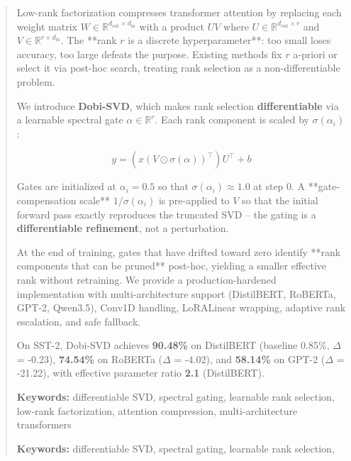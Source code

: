 \documentclass[10pt,twocolumn,letterpaper]{article}
\begin{document}
\maketitle

\begin{abstract}
Low-rank factorization compresses transformer attention by replacing each 
weight matrix $W \in \mathbb{R}^{d_\text{out} \times d_\text{in}}$ with a 
product $U V$ where $U \in \mathbb{R}^{d_\text{out} \times r}$ and 
$V \in \mathbb{R}^{r \times d_\text{in}}$. The **rank $r$ is a discrete 
hyperparameter**: too small loses accuracy, too large defeats the purpose. 
Existing methods fix $r$ a-priori or select it via post-hoc search, treating 
rank selection as a non-differentiable problem.

We introduce \textbf{Dobi-SVD}, which makes rank selection \textbf{differentiable} via 
a learnable spectral gate $\alpha \in \mathbb{R}^r$. Each rank component is 
scaled by $\sigma(\alpha_i)$:

\[
y = (x (V \odot \sigma(\alpha))^\top) U^\top + b
\tag{1}
\]

Gates are initialized at $\alpha_i = 0.5$ so that 
$\sigma(\alpha_i) \approx 1.0$ at step 0. A **gate-compensation 
scale** $1/\sigma(\alpha_i)$ is pre-applied to $V$ so that the initial 
forward pass exactly reproduces the truncated SVD -- the gating is a 
\textbf{differentiable refinement}, not a perturbation.

At the end of training, gates that have drifted toward zero identify **rank 
components that can be pruned** post-hoc, yielding a smaller effective rank 
without retraining. We provide a production-hardened implementation with 
multi-architecture support (DistilBERT, RoBERTa, GPT-2, Qwen3.5), Conv1D 
handling, LoRALinear wrapping, adaptive rank escalation, and safe fallback.

On SST-2, Dobi-SVD achieves \textbf{90.48\%} on DistilBERT (baseline 
0.85\%, $\Delta$ = -0.23), \textbf{74.54\%} on RoBERTa ($\Delta$ = -4.02), 
and \textbf{58.14\%} on GPT-2 ($\Delta$ = -21.22), with effective parameter 
ratio \textbf{2.1\times} (DistilBERT).

\textbf{Keywords:} differentiable SVD, spectral gating, learnable rank selection, 
low-rank factorization, attention compression, multi-architecture transformers



\vspace{0.5em}
\noindent\textbf{Keywords:} differentiable SVD, spectral gating, learnable rank selection,
\end{abstract}
\end{document}
